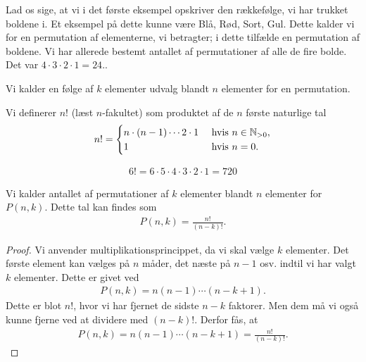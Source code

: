 \begin{exa}
Lad os sige, at vi i det første eksempel opskriver den rækkefølge, vi har trukket boldene i. Et eksempel på dette kunne være Blå, Rød, Sort, Gul. Dette kalder vi for en permutation af elementerne, vi betragter; i dette tilfælde en permutation af boldene. Vi har allerede bestemt antallet af permutationer af alle de fire bolde. Det var $4\cdot 3\cdot 2\cdot 1 = 24.$.
\end{exa}
\begin{defn}[Permutationer]
Vi kalder en følge af $k$ elementer udvalg blandt $n$ elementer for en permutation.
\end{defn}

\begin{defn}[Fakultet]
Vi definerer $n!$ (læst $n$-fakultet) som produktet af de $n$ første naturlige tal
\begin{align*}
	n! = \begin{cases}
		n\cdot (n-1)\cdots 2\cdot 1 \ &\textnormal{hvis }n \in \mathbb{N}_{>0},
		\\
		1 &\textnormal{hvis } n = 0.
	\end{cases}
\end{align*}
\end{defn}


\begin{exa}
	\begin{align*}
		6! = 6 \cdot 5 \cdot 4 \cdot 3 \cdot 2 \cdot 1 = 720
	\end{align*}
\end{exa}

\begin{setn}
	Vi kalder antallet af permutationer af $k$ elementer blandt $n$ elementer for $P(n,k)$. Dette tal kan findes som
	\begin{align*}
		P(n,k) = \frac{n!}{(n-k)!}.
	\end{align*}
\end{setn}

\begin{proof}
	Vi anvender multiplikationsprincippet, da vi skal vælge $k$ elementer. Det første element kan vælges på $n$ måder, det næste på $n-1$ osv. indtil vi har valgt $k$ elementer. Dette er givet ved
		\begin{align*}
			P(n,k) = n(n-1) \cdots (n-k+1).
		\end{align*}
	Dette er blot $n!$, hvor vi har fjernet de sidste $n-k$ faktorer. Men dem må vi også kunne fjerne ved at dividere med $(n-k)!.$ Derfor fås, at 
	\begin{align*}
		P(n,k) = n(n-1) \cdots (n-k+1) = \frac{n!}{(n-k)!}.
	\end{align*}
\end{proof}

